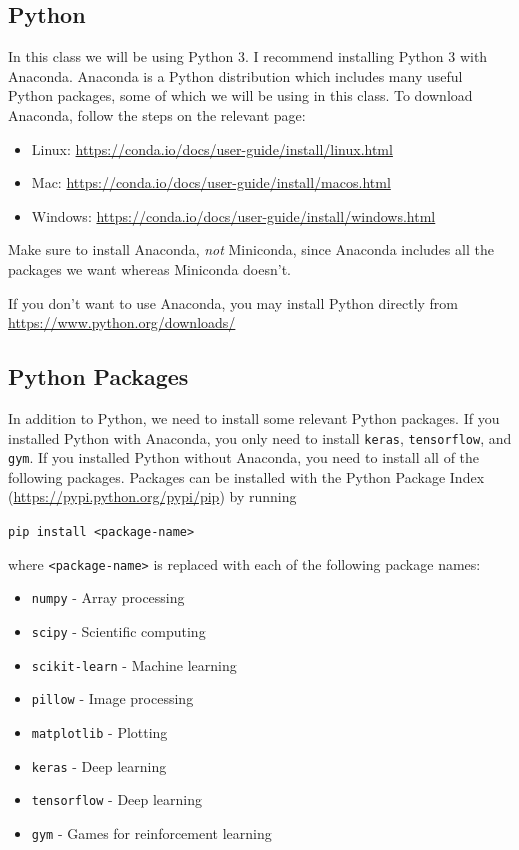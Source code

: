 \documentclass{article}
\begin{document}
\subsection{Python}

In this class we will be using Python 3. I recommend installing Python 3 with Anaconda. Anaconda is a Python distribution which includes many useful Python packages, some of which we will be using in this class. To download Anaconda, follow the steps on the relevant page:

\begin{itemize}
	\item Linux: \url{https://conda.io/docs/user-guide/install/linux.html}
	\item Mac: \url{https://conda.io/docs/user-guide/install/macos.html}
	\item Windows: \url{https://conda.io/docs/user-guide/install/windows.html}
\end{itemize}

Make sure to install Anaconda, \textit{not} Miniconda, since Anaconda includes all the packages we want whereas Miniconda doesn't.

If you don't want to use Anaconda, you may install Python directly from \url{https://www.python.org/downloads/}

\subsection{Python Packages}

In addition to Python, we need to install some relevant Python packages. If you installed Python with Anaconda, you only need to install \texttt{keras}, \texttt{tensorflow}, and \texttt{gym}. If you installed Python without Anaconda, you need to install all of the following packages. Packages can be installed with the Python Package Index (\url{https://pypi.python.org/pypi/pip}) by running

\vspace{2mm}
\texttt{pip install <package-name>}
\vspace{2mm}

\noindent
where \texttt{<package-name>} is replaced with each of the following package names:

\begin{itemize}
	\item \texttt{numpy} - Array processing
	\item \texttt{scipy} - Scientific computing
	\item \texttt{scikit-learn} - Machine learning
	\item \texttt{pillow} - Image processing
	\item \texttt{matplotlib} - Plotting
	\item \texttt{keras} - Deep learning
	\item \texttt{tensorflow} - Deep learning
	\item \texttt{gym} - Games for reinforcement learning
\end{itemize}
\end{document}
